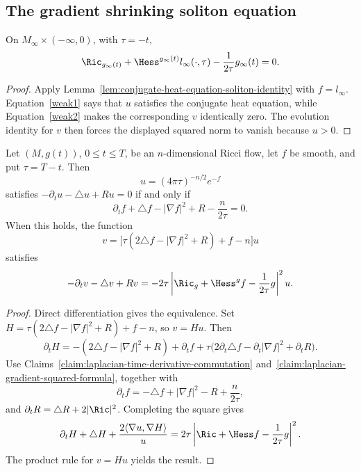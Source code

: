 \subsection{The gradient shrinking soliton equation}

\begin{proposition}\label{prop:limit-gradient-shrinking-soliton-equation}
\label{gradshrink}
On $M_\infty\times(-\infty,0)$, with $\tau=-t$,
\[
 \Ric_{g_\infty(t)}+\Hess^{g_\infty(t)}l_\infty(\cdot,\tau)
 -\frac1{2\tau}g_\infty(t)=0.
\]
\end{proposition}
\begin{proof}
\sketch Apply Lemma~\ref{lem:conjugate-heat-equation-soliton-identity}
with $f=l_\infty$. Equation~\ref{weak1} says that $u$ satisfies the
conjugate heat equation, while Equation~\ref{weak2} makes the
corresponding $v$ identically zero. The evolution identity for $v$
then forces the displayed squared norm to vanish because $u>0$.
\end{proof}

\begin{lemma}\label{lem:conjugate-heat-equation-soliton-identity}
\label{9.1}
Let $(M,g(t))$, $0\leq t\leq T$, be an $n$-dimensional Ricci flow,
let $f$ be smooth, and put $\tau=T-t$. Then
\[
 u=(4\pi\tau)^{-n/2}e^{-f}
\]
satisfies $-\partial_tu-\triangle u+Ru=0$ if and only if
\[
 \partial_tf+\triangle f-|\nabla f|^2+R-\frac n{2\tau}=0.
\]
When this holds, the function
\[
 v=\bigl[\tau(2\triangle f-|\nabla f|^2+R)+f-n\bigr]u
\]
satisfies
\[
 -\partial_tv-\triangle v+Rv
 =-2\tau\left|\Ric_g+\Hess^g f-\frac1{2\tau}g\right|^2u.
\]
\end{lemma}
\begin{proof}
\sketch Direct differentiation gives the equivalence. Set
$H=\tau(2\triangle f-|\nabla f|^2+R)+f-n$, so $v=Hu$. Then
\begin{equation}\label{dHeqn}
 \partial_tH=-(2\triangle f-|\nabla f|^2+R)+\partial_tf
 +\tau\bigl(2\partial_t\triangle f-
 \partial_t|\nabla f|^2+\partial_tR\bigr).
\end{equation}
Use Claims~\ref{claim:laplacian-time-derivative-commutation}
and~\ref{claim:laplacian-gradient-squared-formula}, together with
\begin{equation}\label{feqn}
 \partial_tf=-\triangle f+|\nabla f|^2-R+\frac n{2\tau},
\end{equation}
and $\partial_tR=\triangle R+2|\Ric|^2$. Completing the square gives
\[
 \partial_tH+\triangle H+
 \frac{2\langle\nabla u,\nabla H\rangle}{u}
 =2\tau\left|\Ric+\Hess f-\frac1{2\tau}g\right|^2.
\]
The product rule for $v=Hu$ yields the result.
\end{proof}

